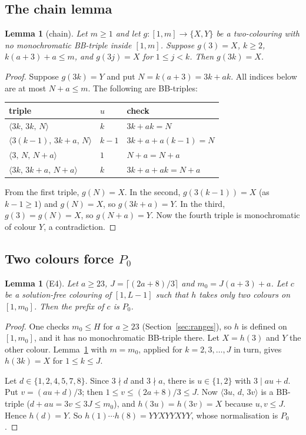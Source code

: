 \documentclass[11pt]{amsart}
\newtheorem{lemma}[theorem]{Lemma}
\theoremstyle{definition}
\theoremstyle{remark}
\newcommand{\Pz}{P_0}
\newcommand{\tri}[3]{\langle #1,\,#2,\,#3\rangle}
\begin{document}
\subsection{The chain lemma}
\begin{lemma}[chain]\label{lem:chain}
Let $m\ge1$ and let $g\colon[1,m]\to\{X,Y\}$ be a two-colouring with no monochromatic BB-triple inside $[1,m]$.
Suppose $g(3)=X$, $k\ge2$, $k(a+3)+a\le m$, and $g(3j)=X$ for $1\le j<k$. Then $g(3k)=X$.
\end{lemma}
\begin{proof}
Suppose $g(3k)=Y$ and put $N=k(a+3)=3k+ak$. All indices below are at most $N+a\le m$. The following are BB-triples:
\begin{center}\begin{tabular}{lll}\toprule
triple & $u$ & check\\\midrule
$\tri{3k}{3k}{N}$ & $k$ & $3k+ak=N$\\
$\tri{3(k-1)}{3k+a}{N}$ & $k-1$ & $3k+a+a(k-1)=N$\\
$\tri{3}{N}{N+a}$ & $1$ & $N+a=N+a$\\
$\tri{3k}{3k+a}{N+a}$ & $k$ & $3k+a+ak=N+a$\\\bottomrule
\end{tabular}\end{center}
From the first triple, $g(N)=X$. In the second, $g(3(k-1))=X$ (as $k-1\ge1$) and $g(N)=X$, so $g(3k+a)=Y$. In the
third, $g(3)=g(N)=X$, so $g(N+a)=Y$. Now the fourth triple is monochromatic of colour $Y$, a contradiction.
\end{proof}

\subsection{Two colours force $\Pz$}
\begin{lemma}[E4]\label{lem:e4}
Let $a\ge23$, $J=\lceil(2a+8)/3\rceil$ and $m_0=J(a+3)+a$. Let $c$ be a solution-free colouring of $[1,L-1]$ such that
$h$ takes only two colours on $[1,m_0]$. Then the prefix of $c$ is $\Pz$.
\end{lemma}
\begin{proof}
One checks $m_0\le H$ for $a\ge23$ (Section~\ref{sec:ranges}), so $h$ is defined on $[1,m_0]$, and it has no
monochromatic BB-triple there. Let $X=h(3)$ and $Y$ the other colour. Lemma~\ref{lem:chain} with $m=m_0$, applied
for $k=2,3,\dots,J$ in turn, gives $h(3k)=X$ for $1\le k\le J$.

Let $d\in\{1,2,4,5,7,8\}$. Since $3\nmid d$ and $3\nmid a$, there is $u\in\{1,2\}$ with $3\mid au+d$. Put
$v=(au+d)/3$; then $1\le v\le(2a+8)/3\le J$. Now $\tri{3u}{d}{3v}$ is a BB-triple ($d+au=3v\le 3J\le m_0$), and
$h(3u)=h(3v)=X$ because $u,v\le J$. Hence $h(d)=Y$. So $h(1)\cdots h(8)=YYXYYXYY$, whose normalisation is $\Pz$.
\end{proof}
\end{document}
